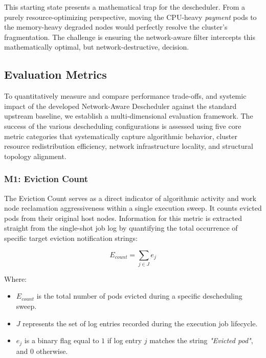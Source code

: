 This starting state presents a mathematical trap for the descheduler. From a purely resource-optimizing perspective, moving the CPU-heavy \textit{payment} pods to the memory-heavy degraded nodes would perfectly resolve the cluster's fragmentation. The challenge is ensuring the network-aware filter intercepts this mathematically optimal, but network-destructive, decision.

\subsection{Evaluation Metrics}
\label{subsec:netaware4_evaluationmetrics}
To quantitatively measure and compare performance trade-offs, and systemic impact of the developed Network-Aware Descheduler against the standard upstream baseline, we establish a multi-dimensional evaluation framework. The success of the various descheduling configurations is assessed using five core metric categories that systematically capture algorithmic behavior, cluster resource redistribution efficiency, network infrastructure locality, and structural topology alignment.

\subsubsection{M1: Eviction Count}
\label{subsubsec:netaware4_evaluationmetrics1}
The Eviction Count serves as a direct indicator of algorithmic activity and work node reclamation aggressiveness within a single execution sweep. It counts evicted pods from their original host nodes. Information for this metric is extracted straight from the single-shot job log by quantifying the total occurrence of specific target eviction notification strings:

\[
E_{count} = \sum_{j \in J} e_j
\]

Where:

\begin{itemize}
    \item \(E_{count}\) is the total number of pods evicted during a specific descheduling sweep.

    \item \(J\) represents the set of log entries recorded during the execution job lifecycle.

    \item \(e_j\) is a binary flag equal to \(1\) if log entry \(j\) matches the string \textit{"Evicted pod"}, and \(0\) otherwise.
\end{itemize}

